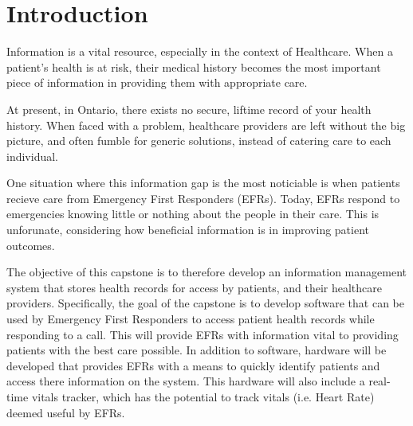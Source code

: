 
\section{Introduction}
\textparagraph
Information is a vital resource, especially in the context of Healthcare. When a patient's health is at risk, their medical history becomes the most important piece of information in providing them with appropriate care.

At present, in Ontario, there exists no secure, liftime record of your health history. When faced with a problem, healthcare providers are left without the big picture, and often fumble for generic solutions, instead of catering care to each individual.

One situation where this information gap is the most noticiable is when patients recieve care from Emergency First Responders (EFRs). Today, EFRs respond to emergencies knowing little or nothing about the people in their care. This is unforunate, considering how beneficial information is in improving patient outcomes. \iffalse For example, nursing homes often carry documents that contain health information on their residents. This information, including medications, allergies and diagonsed disorders gives EFRs an important base-knowledge for how assessing a patient. \fi

The objective of this capstone is to therefore develop an information management system that stores health records for access by patients, and their healthcare providers. Specifically, the goal of the capstone is to develop software that can be used by Emergency First Responders to access patient health records while responding to a call. This will provide EFRs with information vital to providing patients with the best care possible. In addition to software, hardware will be developed that provides EFRs with a means to quickly identify patients and access there information on the system. This hardware will also include a real-time vitals tracker, which has the potential to track vitals (i.e. Heart Rate) deemed useful by EFRs.
